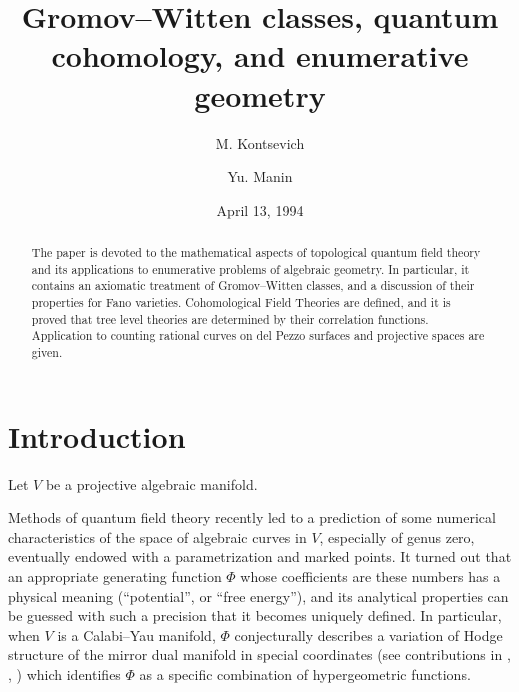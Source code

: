 \documentclass[reqno]{amsart}
\theoremstyle{definition}
\begin{document}
\title[GW classes, quantum cohomology, and enumerative geometry]
{Gromov--Witten classes, quantum cohomology, and enumerative geometry}

\author{M. Kontsevich}
\author{Yu. Manin}
\address{Max--Planck--Institut f\"ur Mathematik, Gottfried--Claren--Str. 26,
53225, Bonn, Germany}

\begin{abstract}
  The paper is devoted to the mathematical aspects of topological
  quantum field theory and its applications to enumerative problems
  of algebraic geometry. In particular, it contains an axiomatic
  treatment of Gromov--Witten classes, and a discussion of
  their properties for Fano varieties. Cohomological
  Field Theories are defined, and it is proved that
  tree level theories are determined by their correlation
  functions. Application to counting rational curves
  on del Pezzo surfaces and projective spaces are given.
\end{abstract}

\date{April 13, 1994}
\maketitle
\tableofcontents


\section{Introduction}


Let $V$ be a projective algebraic manifold.


Methods of quantum field theory recently led to a prediction of some
numerical characteristics of the space of algebraic curves in $V$,
especially of
genus zero, eventually endowed with a parametrization
and marked points. It turned out that an appropriate generating
function $\Phi$ whose coefficients are these numbers has a physical
meaning (``potential'', or ``free energy''), and its analytical
properties can be guessed with such a precision that it becomes
uniquely defined. In particular, when $V$ is a Calabi--Yau manifold,
$\Phi$ conjecturally describes a variation of Hodge structure of
the mirror dual manifold in special coordinates (see contributions
in \cite{Y}, \cite{Ko}, \cite{Ma2}) which identifies $\Phi$ as a
specific combination of
hypergeometric functions.
\end{document}
